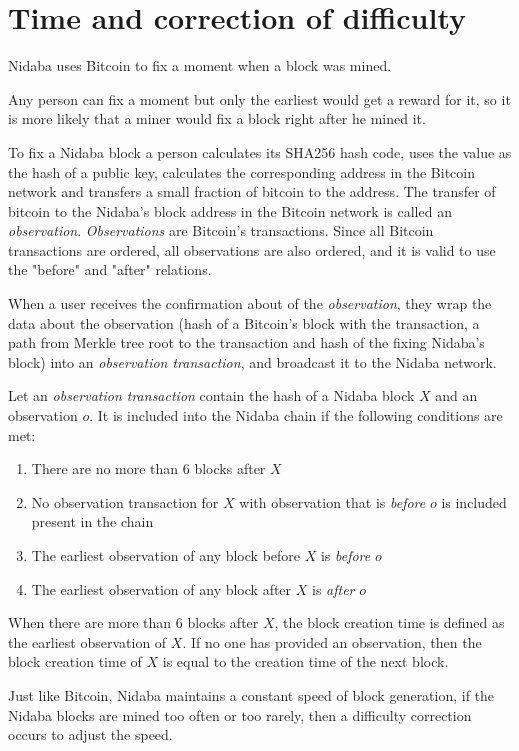 \documentclass[12pt]{article}
\begin{document}
\section{Time and correction of difficulty}

Nidaba uses Bitcoin to fix a moment when a block was mined.

Any person can fix a moment but only the earliest would get a reward for it, so it is more likely that a miner would fix a block right after he mined it.

To fix a Nidaba block a person calculates its SHA256 hash code, uses the value as the hash of a public key, calculates the corresponding address in the Bitcoin network and transfers a small fraction of bitcoin to the address. The transfer of bitcoin to the Nidaba's block address in the Bitcoin network is called an \textit{observation}. \textit{Observations} are Bitcoin's transactions. Since all Bitcoin transactions are ordered, all observations are also ordered, and it is valid to use the "before" and "after" relations.

When a user receives the confirmation about of the \textit{observation}, they wrap the data about the observation (hash of a Bitcoin's block with the transaction, a path from Merkle tree root to the transaction and hash of the fixing Nidaba's block) into an \textit{observation transaction}, and broadcast it to the Nidaba network.

Let an \textit{observation transaction} contain the hash of a Nidaba block $X$ and an observation $o$. It is included into the Nidaba chain if the following conditions are met:
\begin{enumerate}
  \item There are no more than 6 blocks after $X$
  \item No observation transaction for $X$ with observation that is \textit{before} $o$ is included present in the chain
  \item The earliest observation of any block before $X$ is \textit{before} $o$
  \item The earliest observation of any block after $X$ is \textit{after} $o$
\end{enumerate}

When there are more than 6 blocks after $X$, the block creation time is defined as the earliest observation of $X$. If no one has provided an observation, then the block creation time of $X$ is equal to the creation time of the next block.

Just like Bitcoin, Nidaba maintains a constant speed of block generation, if the Nidaba blocks are mined too often or too rarely, then a difficulty correction occurs to adjust the speed.
\end{document}
